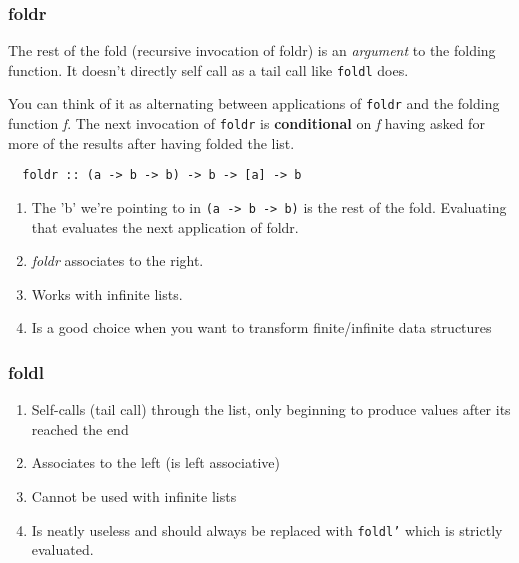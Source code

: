 \subsubsection{foldr}
The rest of the fold (recursive invocation of foldr) is an \emph{argument} to the folding function. It doesn't directly self call as a tail call
like \texttt{foldl} does.

You can think of it as alternating between applications of \texttt{foldr} and the folding function \emph{f}.
The next invocation of \texttt{foldr} is \textbf{conditional} on \emph{f} having asked for more of the results after having folded the list.

\begin{lstlisting}
  foldr :: (a -> b -> b) -> b -> [a] -> b
\end{lstlisting}

\begin{enumerate}
\item The 'b' we're pointing to in \texttt{(a -> b -> b)} is the rest of the fold. Evaluating that evaluates the next application of foldr.
\item \emph{foldr} associates to the right.
\item Works with infinite lists.
\item Is a good choice when you want to transform finite/infinite data structures
\end{enumerate}

\subsubsection{foldl}
\begin{enumerate}
\item Self-calls (tail call) through the list, only beginning to produce values after its reached the end
\item Associates to the left (is left associative)
\item Cannot be used with infinite lists
\item Is neatly useless and should always be replaced with \texttt{foldl'} which is strictly evaluated.
\end{enumerate}